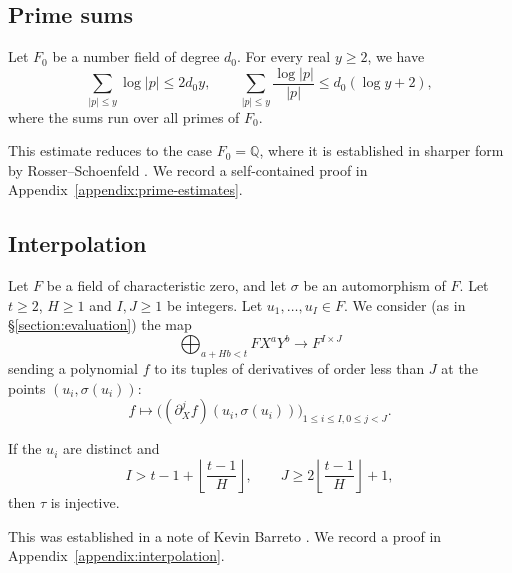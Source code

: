 \documentclass[reqno]{amsart} 
\begin{document}
\subsection{Prime sums}\label{sec:cus71nhbml}

\begin{lemma}\label{lemma:prime-estimates}
  Let $F_0$ be a number field of degree $d_0$.  For every real $y \geq 2$, we have
  \begin{equation*}
    \sum_{|p| \leq y} \log |p| \leq 2d_0 y,
    \qquad
    \sum_{|p| \leq y} \frac{\log |p|}{|p|} \leq d_0(\log y + 2),
  \end{equation*}
  where the sums run over all primes of $F_0$.
\end{lemma}
This estimate reduces to the case $F_0 = \mathbb{Q}$, where it is established in sharper form by Rosser--Schoenfeld \cite[(3.24), (3.32)]{rosser-schoenfeld-1962}.  We record a self-contained proof in Appendix~\ref{appendix:prime-estimates}.

\subsection{Interpolation}\label{section:interpolation}

Let $F$ be a field of characteristic zero, and let $\sigma$ be an automorphism of $F$.  Let $t \geq 2$, $H \geq 1$ and $I, J \geq 1$ be integers.  Let $u_1, \dotsc, u_I \in F$.  We consider (as in \S\ref{section:evaluation}) the map
\begin{equation*}
  \bigoplus_{a + H b < t} F X^a Y^b \longrightarrow F^{I \times J}
\end{equation*}
sending a polynomial $f$ to its tuples of derivatives of order less than $J$ at the points $(u_i, \sigma(u_i))$:
\begin{equation*}
  f \mapsto \bigl((\partial_X^j f)(u_i, \sigma(u_i))\bigr)_{1 \leq i \leq I, 0 \leq j < J}.
\end{equation*}

\begin{lemma}\label{lemma:triangle-interpolation}
  If the $u_i$ are distinct and
  \begin{equation*}
    I > t - 1 + \left\lfloor\frac{t - 1}{H}\right\rfloor,
    \qquad
    J \geq 2\left\lfloor\frac{t - 1}{H}\right\rfloor + 1,
  \end{equation*}
  then $\tau$ is injective.
\end{lemma}
This was established in a note of Kevin Barreto \cite{Barreto2026SiegelZeros}.  We record a proof in Appendix~\ref{appendix:interpolation}.
\end{document}
